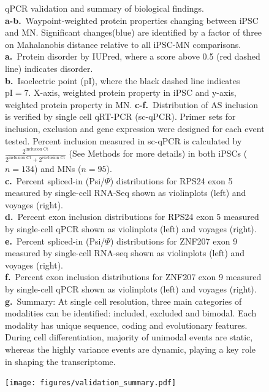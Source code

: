 \clearpage
\thispagestyle{facingcaption}
\begin{figure}[h]
\captionsetup{labelformat=prev-page}
\caption[qPCR validation and summary of biological findings.]{qPCR validation and summary of biological findings.\\
\textbf{a-b.}~Waypoint-weighted protein properties changing between iPSC and MN. Significant changes(blue) are identified by a factor of three on Mahalanobis distance relative to all iPSC-MN comparisons.\\
\textbf{a.}~Protein disorder by IUPred, where a score above 0.5 (red dashed line) indicates disorder.\\
\textbf{b.}~Isoelectric point (pI), where the black dashed line indicates $\text{pI}=7$. X-axis, weighted protein property in iPSC and y-axis, weighted protein property in MN.
\textbf{c-f.}~Distribution of AS inclusion is verified by single cell qRT-PCR (sc-qPCR). Primer sets for inclusion, exclusion and gene expression were designed for each event tested. Percent inclusion measured in sc-qPCR is calculated by $\frac{2^{\text{inclusion Ct}}}{2^{\text{inclusion Ct}} + 2^{\text{exclusion Ct}}}$ (See Methods for more details) in both iPSCs ($n =134$) and MNs ($n = 95$). \\
\textbf{c.}~Percent spliced-in (Psi/$\Psi$) distributions for RPS24 exon 5 measured by single-cell RNA-Seq shown as violinplots (left) and voyages (right).\\
\textbf{d.}~Percent exon inclusion distributions for RPS24 exon 5 measured by single-cell qPCR shown as violinplots (left) and voyages (right).\\
\textbf{e.}~Percent spliced-in (Psi/$\Psi$) distributions for ZNF207 exon 9 measured by single-cell RNA-seq shown as violinplots (left) and voyages (right).\\
\textbf{f.}~Percent exon inclusion distributions for ZNF207 exon 9 measured by single-cell qPCR shown as violinplots (left) and voyages (right).\\
\textbf{g.}~Summary: At single cell resolution, three main categories of modalities can be identified: included, excluded and bimodal. Each modality has unique sequence, coding and evolutionary features. During cell differentiation, majority of unimodal events are static, whereas the highly variance events are dynamic, playing a key role in shaping the transcriptome.
}
\label{fig:validation_summary}
\end{figure}
\clearpage
\begin{figure}[h]
\ContinuedFloat
\captionsetup{labelformat=empty}
\centering
\texttt{[image: figures/validation\_summary.pdf]}
\end{figure}
\clearpage



